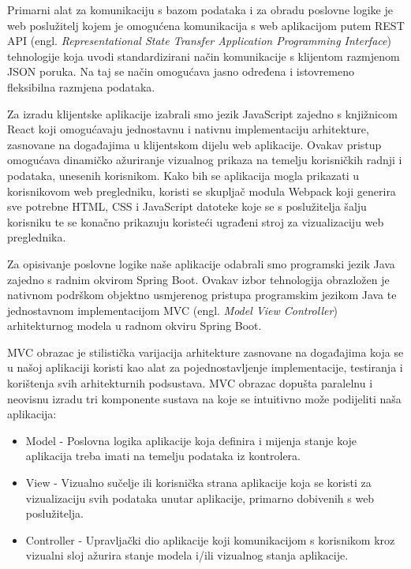 Primarni alat za komunikaciju s bazom podataka i za obradu poslovne logike je web poslužitelj kojem je omogućena komunikacija s web aplikacijom putem REST API (engl. \textit{Representational State Transfer Application Programming Interface}) tehnologije koja uvodi standardizirani način
komunikacije s klijentom razmjenom JSON poruka. Na taj se način omogućava jasno određena i istovremeno fleksibilna razmjena podataka.

Za izradu klijentske aplikacije izabrali smo jezik JavaScript zajedno s knjižnicom React koji omogućavaju jednostavnu i nativnu implementaciju arhitekture, zasnovane na događajima u klijentskom dijelu web aplikacije. Ovakav pristup omogućava dinamičko ažuriranje vizualnog prikaza na
temelju korisničkih radnji i podataka, unesenih korisnikom. Kako bih se aplikacija mogla prikazati u korisnikovom web pregledniku, koristi se skupljač modula Webpack koji generira sve potrebne HTML, CSS i JavaScript datoteke koje se s poslužitelja šalju korisniku te se konačno prikazuju
koristeći ugrađeni stroj za vizualizaciju web preglednika.

Za opisivanje poslovne logike naše aplikacije odabrali smo programski jezik Java zajedno s radnim okvirom Spring Boot. Ovakav izbor tehnologija obrazložen je nativnom podrškom objektno usmjerenog pristupa programskim jezikom Java te jednostavnom implementacijom MVC 
(engl. \textit{Model View Controller}) arhitekturnog modela u radnom okviru Spring Boot.

MVC obrazac je stilistička varijacija arhitekture zasnovane na događajima koja se u našoj aplikaciji koristi kao alat za pojednostavljenje implementacije, testiranja i korištenja svih arhitekturnih podsustava. MVC obrazac dopušta paralelnu i neovisnu izradu tri komponente sustava
na koje se intuitivno može podijeliti naša aplikacija:
\begin{itemize}
	\item 	Model - Poslovna logika aplikacije koja definira i mijenja stanje koje aplikacija treba imati na temelju podataka iz kontrolera.
	\item 	View - Vizualno sučelje ili korisnička strana aplikacije koja se koristi za vizualizaciju svih podataka unutar aplikacije, primarno dobivenih s web poslužitelja.
	\item 	Controller - Upravljački dio aplikacije koji komunikacijom s korisnikom kroz vizualni sloj ažurira stanje modela i/ili vizualnog stanja aplikacije.
\end{itemize}

